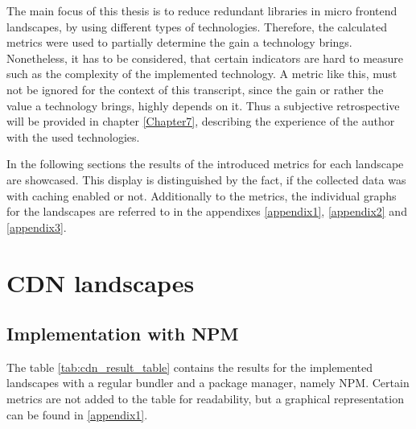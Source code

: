 The main focus of this thesis is to reduce redundant libraries in micro frontend landscapes, by using different types of technologies. Therefore, the calculated metrics were used to partially determine the gain a technology brings. Nonetheless, it has to be considered, that certain indicators are hard to measure such as the complexity of the implemented technology.  
A metric like this, must not be ignored for the context of this transcript, since the gain or rather the value a technology brings, highly depends on it. Thus a subjective retrospective will be provided in chapter \ref{Chapter7}, describing the experience of the author with the used technologies.

In the following sections the results of the introduced metrics for each landscape are showcased. This display is distinguished by the fact, if the collected data was with caching enabled or not. Additionally to the metrics, the individual graphs for the landscapes are referred to in the appendixes \ref{appendix1}, \ref{appendix2} and \ref{appendix3}.

\section{CDN landscapes}

\subsection{Implementation with NPM}

The table \ref{tab:cdn_result_table} contains the results for the implemented landscapes with a regular bundler and a package manager, namely NPM. Certain metrics are not added to the table for readability, but a graphical representation can be found in \ref{appendix1}.

\scriptsize 
\setlength{\mycolwidth}{\dimexpr \textwidth/5 - 2\tabcolsep}%

